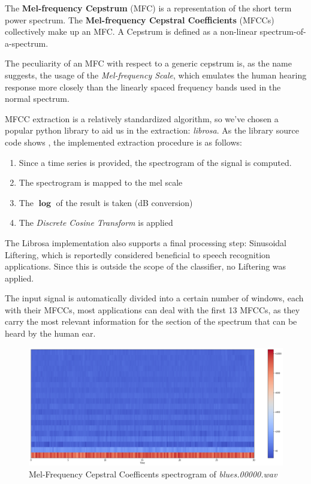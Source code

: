 \documentclass[12pt]{article}
\begin{document}
	The \textbf{Mel-frequency Cepstrum} (MFC) is a representation of the short term power spectrum. The \textbf{Mel-frequency Cepstral Coefficients} (MFCCs) collectively make up an MFC. A Cepstrum is defined as a non-linear spectrum-of-a-spectrum.
	
	The peculiarity of an MFC with respect to a generic cepstrum is, as the name suggests, the usage of the \textit{Mel-frequency Scale}, which emulates the human hearing response more closely than the linearly spaced frequency bands used in the normal spectrum.
	
	MFCC extraction is a relatively standardized algorithm, so we've chosen a popular python library to aid us in the extraction: \textit{librosa}. As the library source code shows \cite{librosarepo}, the implemented extraction procedure is as follows:
	\begin{enumerate}
	\item Since a time series is provided, the spectrogram of the signal is computed.
	\item The spectrogram is mapped to the mel scale
	\item The $\mathbf{\log}$ of the result is taken (dB conversion)
	\item The \textit{Discrete Cosine Transform} is applied
	\end{enumerate}
	
	The Librosa implementation also supports a final processing step: Sinusoidal Liftering, which is reportedly considered beneficial to speech recognition applications. Since this is outside the scope of the classifier, no Liftering was applied.
	
	The input signal is automatically divided into a certain number of windows, each with their MFCCs, most applications can deal with the first 13 MFCCs, as they carry the most relevant information for the section of the spectrum that can be heard by the human ear.
	\begin{figure}[H]
		\includegraphics[scale=0.4]{mfcc_spectrogram}
		\caption{Mel-Frequency Cepstral Coefficents spectrogram of \textit{blues.00000.wav}}
	\end{figure}
	
\end{document}
